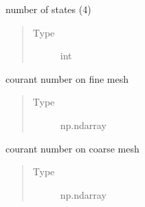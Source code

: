 \documentclass[letterpaper,10pt,english]{sphinxmanual}
\begin{document}
\begin{fulllineitems}
\begin{fulllineitems}
\begin{quote}
\begin{description}
\end{description}\end{quote}

\end{fulllineitems}


\begin{fulllineitems}
\label{\detokenize{autoapi/NavierStokes/index:NavierStokes.NavierStokes.dimensions}}
\sphinxAtStartPar
number of states (4)
\begin{quote}\begin{description}
\item[{Type}] \leavevmode
\sphinxAtStartPar
int

\end{description}\end{quote}

\end{fulllineitems}


\begin{fulllineitems}
\label{\detokenize{autoapi/NavierStokes/index:NavierStokes.NavierStokes.cfl_fine}}
\sphinxAtStartPar
courant number on fine mesh
\begin{quote}\begin{description}
\item[{Type}] \leavevmode
\sphinxAtStartPar
np.ndarray

\end{description}\end{quote}

\end{fulllineitems}


\begin{fulllineitems}
\label{\detokenize{autoapi/NavierStokes/index:NavierStokes.NavierStokes.cfl_coarse}}
\sphinxAtStartPar
courant number on coarse mesh
\begin{quote}\begin{description}
\item[{Type}] \leavevmode
\sphinxAtStartPar
np.ndarray


\end{description}
\end{quote}
\end{fulllineitems}
\end{fulllineitems}
\end{document}
